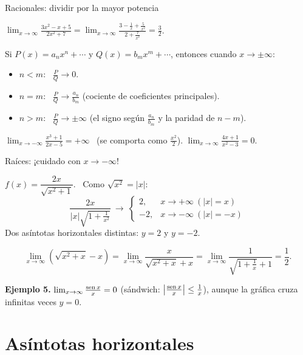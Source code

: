 \documentclass[10pt,aspectratio=169]{beamer}
\begin{document}
\begin{frame}{Racionales: dividir por la mayor potencia}
  \begin{ejemplo}[1]
    $\displaystyle\lim_{x\to\infty}\frac{3x^2-x+5}{2x^2+7}=\lim_{x\to\infty}\frac{3-\frac1x+\frac5{x^2}}{2+\frac7{x^2}}=\frac32$.
  \end{ejemplo}
  \begin{teorema}
    Si $P(x)=a_nx^n+\cdots$ y $Q(x)=b_mx^m+\cdots$, entonces cuando $x\to\pm\infty$:
    \begin{itemize}
      \item $n<m$: \ $\frac PQ\to0$.
      \item $n=m$: \ $\frac PQ\to\frac{a_n}{b_m}$ (cociente de coeficientes principales).
      \item $n>m$: \ $\frac PQ\to\pm\infty$ (el signo según $\frac{a_n}{b_m}$ y la paridad de $n-m$).
    \end{itemize}
  \end{teorema}
  \begin{ejemplo}[2]
    $\displaystyle\lim_{x\to-\infty}\frac{x^3+1}{2x-5}=+\infty$ \ (se comporta como $\frac{x^2}{2}$). \qquad
    $\displaystyle\lim_{x\to\infty}\frac{4x+1}{x^2-3}=0$.
  \end{ejemplo}
\end{frame}

\begin{frame}{Raíces: ¡cuidado con $x\to-\infty$!}
  \begin{ejemplo}[3]
    $f(x)=\dfrac{2x}{\sqrt{x^2+1}}$. \ Como $\sqrt{x^2}=|x|$:
    \[ \frac{2x}{|x|\sqrt{1+\frac1{x^2}}}\ \to\ \begin{cases}2,&x\to+\infty\ (|x|=x)\\-2,&x\to-\infty\ (|x|=-x)\end{cases} \]
    Dos asíntotas horizontales distintas: $y=2$ y $y=-2$.
  \end{ejemplo}
  \begin{ejemplo}
    \[ \lim_{x\to\infty}\left(\sqrt{x^2+x}-x\right)=\lim_{x\to\infty}\frac{x}{\sqrt{x^2+x}+x}=\lim_{x\to\infty}\frac{1}{\sqrt{1+\frac1x}+1}=\frac12. \]
  \end{ejemplo}
  \small \textbf{Ejemplo 5.} $\lim_{x\to\infty}\frac{\operatorname{sen} x}{x}=0$ (sándwich: $\left|\frac{\operatorname{sen} x}x\right|\le\frac1x$), aunque la gráfica cruza infinitas veces $y=0$.
\end{frame}

\section{Asíntotas horizontales}
\end{document}
